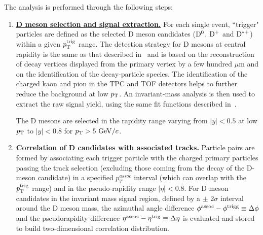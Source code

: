 The analysis is performed through the following steps:
\begin{enumerate}

\item
\underline {\bf D meson selection and signal extraction.}  For each single event, ``trigger" particles
are defined as the selected  D meson candidates (${\rm D^0}$, ${\rm D^+}$ and ${\rm D^{*+}}$)
within a given $p_{\rm T}^{\rm trig}$ range. The detection strategy for D mesons at central rapidity is
the same as that described in~\cite{ALICEDmespp7Tev} and is based on the reconstruction of decay 
vertices displayed from the primary vertex by a few hundred $\mu$m and on the identification of the decay-particle species.
The identification of the charged kaon and pion in the TPC and TOF
detectors helps to further reduce the background at low $p_{\rm T}$.  An
invariant-mass analysis is then used to extract the raw signal yield, using
the same fit functions described in~\cite{ALICEDmespp7Tev}.


The D mesons are selected in the rapidity range varying from $|y|<0.5$ at low $p_{\rm T}$ to $|y|<0.8$ for $p_{\rm T}>5~\mathrm{GeV}/c$. %

\item
\underline {\bf Correlation of D candidates with associated tracks.}
Particle pairs are formed by associating each trigger particle with
the charged primary particles passing the track selection (excluding those coming from the decay of the D-meson candidate) in a specified $p^{assoc}_{T}$
interval (which can overlap with the $p_{\rm T}^{\rm trig}$ range) and in the pseudo-rapidity range $|\eta|<0.8$. For D meson candidates
in the invariant mass signal region, defined by a $\pm$ 2$\sigma$ interval around the D meson mass, the azimuthal angle difference $\phi^{\rm assoc}-\phi^{\rm trigg}\equiv\Delta\phi$
and the pseudorapidity difference $\eta^{\rm assoc}-\eta^{\rm trig}\equiv\Delta \eta$ is evaluated and stored to build two-dimensional correlation distribution. %


\end{enumerate}
